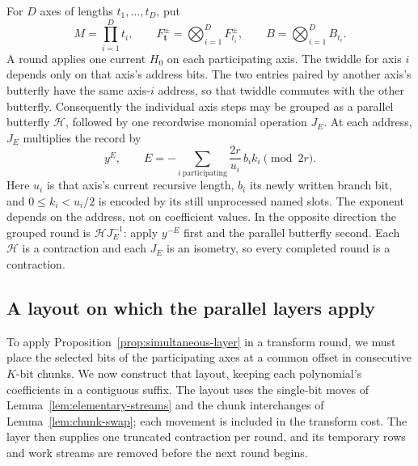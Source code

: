 \documentclass[11pt]{article}
\theoremstyle{definition}
\begin{document}
For $D$ axes of lengths $t_1,\ldots,t_D$, put
\[
 M=\prod_{i=1}^D t_i,\qquad
 F_{\boldsymbol t}^\pm=\bigotimes_{i=1}^D F_{t_i}^\pm,
 \qquad B=\bigotimes_{i=1}^D B_{t_i}.
\]
A round applies one current $H_0$ on each participating axis.  The
twiddle for axis $i$ depends only on that axis's address bits.
The two entries paired by another axis's butterfly have the same
axis-$i$ address, so that twiddle commutes with the other butterfly.
Consequently the individual axis steps may be grouped as a parallel
butterfly $\mathcal H$, followed by one recordwise monomial operation
$J_E$.  At each address, $J_E$ multiplies the record by
\begin{equation}
       y^{E},\qquad
 E=-\sum_{i\ \mathrm{participating}}
       \frac{2r}{u_i}\,b_i k_i\pmod{2r}.
 \label{eq:combined-twiddle}
\end{equation}
Here $u_i$ is that axis's current recursive length, $b_i$ its newly
written branch bit, and $0\leq k_i<u_i/2$ is encoded by its still
unprocessed named slots.  The exponent depends on the address, not
on coefficient values.  In the opposite direction the grouped round
is $\mathcal HJ_E^{-1}$: apply $y^{-E}$ first and the parallel
butterfly second.  Each $\mathcal H$ is a contraction and each
$J_E$ is an isometry, so every completed round is a contraction.

\subsection{A layout on which the parallel layers apply}

To apply Proposition~\ref{prop:simultaneous-layer} in a transform round,
we must place the selected bits of the participating axes at a common
offset in consecutive $K$-bit chunks. We now construct that layout,
keeping each polynomial's coefficients in a contiguous suffix. The
layout uses the single-bit moves of
Lemma~\ref{lem:elementary-streams} and the chunk interchanges of
Lemma~\ref{lem:chunk-swap}; each movement is included in the transform
cost. The layer then supplies one truncated contraction per round,
and its temporary rows and work streams are removed before the next
round begins.
\end{document}
